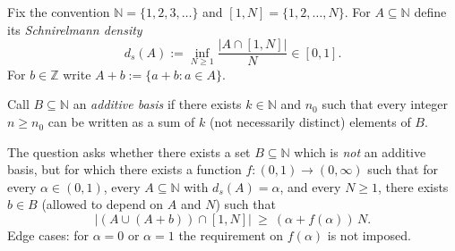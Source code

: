Fix the convention $\mathbb N=\{1,2,3,\dots\}$ and $[1,N]=\{1,2,\dots,N\}$.  For $A\subseteq\mathbb N$ define its \emph{Schnirelmann density}
\[
 d_s(A):=\inf_{N\ge 1}\frac{|A\cap[1,N]|}{N}\in[0,1].
\]
For $b\in\mathbb Z$ write $A+b:=\{a+b:a\in A\}$.

Call $B\subseteq\mathbb N$ an \emph{additive basis} if there exists $k\in\mathbb N$ and $n_0$ such that every integer $n\ge n_0$ can be written as a sum of $k$ (not necessarily distinct) elements of $B$.

The question asks whether there exists a set $B\subseteq\mathbb N$ which is \emph{not} an additive basis, but for which there exists a function $f:(0,1)\to(0,\infty)$ such that for every $\alpha\in(0,1)$, every $A\subseteq\mathbb N$ with $d_s(A)=\alpha$, and every $N\ge 1$, there exists $b\in B$ (allowed to depend on $A$ and $N$) such that
\[
\bigl|(A\cup (A+b))\cap[1,N]\bigr|\ \ge\ (\alpha+f(\alpha))\,N.
\]
Edge cases: for $\alpha=0$ or $\alpha=1$ the requirement on $f(\alpha)$ is not imposed.
